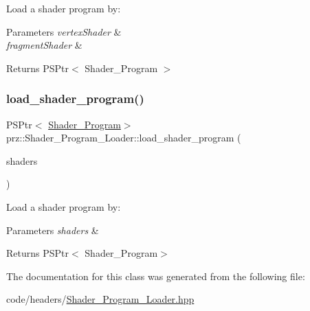 Load a shader program by\+: 


\begin{DoxyParams}{Parameters}
{\em vertex\+Shader} & \\
\hline
{\em fragment\+Shader} & \\
\hline
\end{DoxyParams}
\begin{DoxyReturn}{Returns}
P\+S\+Ptr$<$ Shader\+\_\+\+Program $>$ 
\end{DoxyReturn}
\mbox{\label{classprz_1_1_shader___program___loader_abea22b3ab2b7723d8a43bf7ab66cfdaf}} 
\subsubsection{\texorpdfstring{load\_shader\_program()}{load\_shader\_program()}\hspace{0.1cm}{\footnotesize\ttfamily [4/4]}}
{\footnotesize\ttfamily P\+S\+Ptr$<$ \mbox{\hyperlink{classprz_1_1_shader___program}{Shader\+\_\+\+Program}}$>$ prz\+::\+Shader\+\_\+\+Program\+\_\+\+Loader\+::load\+\_\+shader\+\_\+program (\begin{DoxyParamCaption}\item[{P\+Buffer$<$ P\+S\+Ptr$<$ \mbox{\hyperlink{classprz_1_1_shader}{Shader}} $>$ $>$ \&}]{shaders }\end{DoxyParamCaption})\hspace{0.3cm}{\ttfamily [inline]}}



Load a shader program by\+: 


\begin{DoxyParams}{Parameters}
{\em shaders} & \\
\hline
\end{DoxyParams}
\begin{DoxyReturn}{Returns}
P\+S\+Ptr$<$ Shader\+\_\+\+Program$>$ 
\end{DoxyReturn}


The documentation for this class was generated from the following file\+:\begin{DoxyCompactItemize}
\item 
code/headers/\mbox{\hyperlink{_shader___program___loader_8hpp}{Shader\+\_\+\+Program\+\_\+\+Loader.\+hpp}}\end{DoxyCompactItemize}
